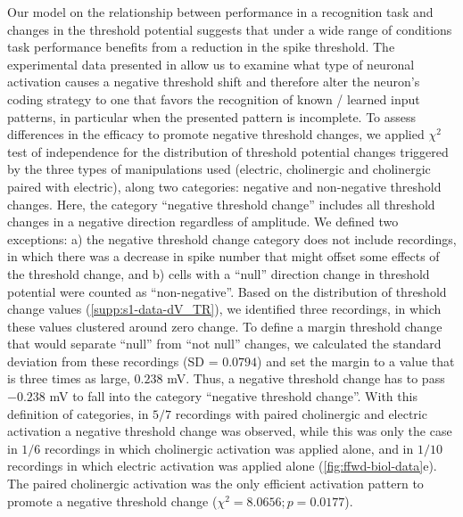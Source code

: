 Our model on the relationship
        between performance in a recognition task and changes in the threshold potential
        suggests that under a wide range of conditions
        task performance benefits from a reduction in the spike threshold.
    The experimental data presented in \cite{Gill2020-wy} allow us to examine
        what type of neuronal activation
        causes a negative threshold shift
        and therefore alter the neuron's coding strategy to one that favors the recognition of known / learned input patterns,
        in particular when the presented pattern is incomplete.
    To assess differences in the efficacy to promote negative threshold changes, we applied $\chi^2$ test of independence
        for the distribution of threshold potential changes
        triggered by the three types of manipulations used (electric, cholinergic and cholinergic paired with electric),
        along two categories: negative and non-negative threshold changes.
    Here, the category ``negative threshold change'' includes all threshold changes in a negative direction regardless of amplitude.
    We defined two exceptions:
        a) the negative threshold change category does not include recordings,
            in which there was a decrease in spike number
                that might offset some effects of the threshold change,
        and b) cells with a ``null'' direction change in threshold potential
            were counted as ``non-negative''.
    Based on the distribution of threshold change values (\autoref{supp:s1-data-dV_TR}),
        we identified three recordings, in which these values clustered around zero change.
    To define a margin threshold change that would separate ``null'' from ``not null'' changes,
        we calculated the standard deviation from these recordings (SD = $0.0794$)
        and set the margin to a value that is three times as large, $0.238$ mV.
    Thus, a negative threshold change has to pass $-0.238$ mV
        to fall into the category ``negative threshold change''.
    With this definition of categories,
        in $5/7$ recordings
            with paired cholinergic and electric activation
            a negative threshold change was observed,
        while this was only the case in $1/6$ recordings
            in which cholinergic activation was applied alone,
        and in $1/10$ recordings in which electric activation was applied alone
        (\autoref{fig:ffwd-biol-data}e).
    The paired cholinergic activation was the only efficient activation pattern to promote a negative threshold change ($\chi^2 = 8.0656; p = 0.0177$).
